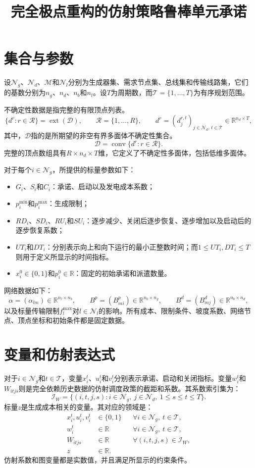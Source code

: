 \documentclass[11pt]{article}
\title{完全极点重构的仿射策略鲁棒单元承诺}
\author{}
\date{}
\begin{document}
\maketitle

\section{集合与参数}

设$\mathcal N_g$、$\mathcal N_d$、$\mathcal M$和$\mathcal N_l$分别为生成器集、需求节点集、总线集和传输线路集，它们的基数分别为$n_g$、$n_d$、$n_b$和$n_l$。设$T$为周期数，而$\mathcal T=\{1,\ldots,T\}$为有序规划范围。

不确定性数据是指完整的有限顶点列表。
\[
\{d^r:r\in\mathcal R\}=\operatorname{ext}(\mathcal D),
\qquad \mathcal R=\{1,\ldots,R\},
\qquad d^r=(d_j^{r,t})_{j\in\mathcal N_d,\,t\in\mathcal T}
\in\mathbb R^{n_d\times T},
\]
其中，$\mathcal D$指的是所期望的非空有界多面体不确定性集合。
\[
\mathcal D=\operatorname{conv}\{d^r:r\in\mathcal R\}.
\]
完整的顶点数组具有$R\times n_d\times T$维，它定义了不确定性多面体，包括低维多面体。

对于每个$i\in\mathcal N_g$，所提供的标量参数如下：
\begin{itemize}
\item $G_i$、$S_i$和$C_i$：承诺、启动以及发电成本系数；
\item $p_i^{\min}$和$p_i^{\max}$：生成限制；
\item $RD_i$、$SD_i$、$RU_i$和$SU_i$：逐步减少、关闭后逐步恢复、逐步增加以及启动后的逐步恢复系数；
\item $UT_i$和$DT_i$：分别表示向上和向下运行的最小正整数时间；而$1\le UT_i,DT_i\le T$则用于定义所显示的时间指标。
\item $x_i^0\in\{0,1\}$和$p_i^0\in\mathbb R$：固定的初始承诺和派遣数量。
\end{itemize}
网络数据如下：
\[
\alpha=(\alpha_{lm})\in\mathbb R^{n_l\times n_b},
\qquad B^p=(B^p_{mi})\in\mathbb R^{n_b\times n_g},
\qquad B^d=(B^d_{mj})\in\mathbb R^{n_b\times n_d},
\]
以及标量传输限制$f_l^{\max}$对$l\in\mathcal N_l$的影响。所有成本、限制条件、坡度系数、网络节点、顶点坐标和初始条件都是固定数据。

\section{变量和仿射表达式}

对于$i\in\mathcal N_g$和$t\in\mathcal T$，变量$x_i^t$、$u_i^t$和$v_i^t$分别表示承诺、启动和关闭指标。变量$w_i^t$和$W_{itjs}$则是完全依赖历史数据的仿射调度政策的截距和系数。其系数索引集为：
\[
\mathcal I_W=\{(i,t,j,s):i\in\mathcal N_g,\ j\in\mathcal N_d,
\ 1\le s\le t\le T\}.
\]
标量$z$是生成成本相关的变量。其对应的领域是：
\begin{align}
 x_i^t,u_i^t,v_i^t&\in\{0,1\}
 &&\forall i\in\mathcal N_g,\ t\in\mathcal T,\label{eq:binary}\\
 w_i^t&\in\mathbb R
 &&\forall i\in\mathcal N_g,\ t\in\mathcal T,\\
 W_{itjs}&\in\mathbb R
 &&\forall(i,t,j,s)\in\mathcal I_W,\\
 z&\in\mathbb R.
\end{align}
仿射系数和图变量都是实数值，并且满足所显示的约束条件。
\end{document}
